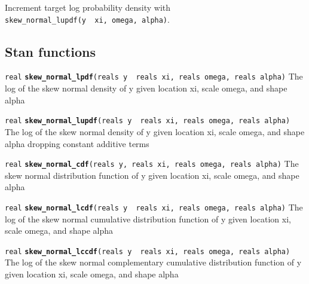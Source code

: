 \documentclass[
  10pt,
]{book}
\begin{document}
Increment target log probability density with \texttt{skew\_normal\_lupdf(y\ \textbar{}\ xi,\ omega,\ alpha)}.

\hypertarget{stan-functions-25}{%
\subsection{Stan functions}\label{stan-functions-25}}


\texttt{real} \textbf{\texttt{skew\_normal\_lpdf}}\texttt{(reals\ y\ \textbar{}\ reals\ xi,\ reals\ omega,\ reals\ alpha)}\newline
The log of the skew normal density of y given location xi, scale
omega, and shape alpha


\texttt{real} \textbf{\texttt{skew\_normal\_lupdf}}\texttt{(reals\ y\ \textbar{}\ reals\ xi,\ reals\ omega,\ reals\ alpha)}\newline
The log of the skew normal density of y given location xi, scale
omega, and shape alpha dropping constant additive terms


\texttt{real} \textbf{\texttt{skew\_normal\_cdf}}\texttt{(reals\ y,\ reals\ xi,\ reals\ omega,\ reals\ alpha)}\newline
The skew normal distribution function of y given location xi, scale
omega, and shape alpha


\texttt{real} \textbf{\texttt{skew\_normal\_lcdf}}\texttt{(reals\ y\ \textbar{}\ reals\ xi,\ reals\ omega,\ reals\ alpha)}\newline
The log of the skew normal cumulative distribution function of y given
location xi, scale omega, and shape alpha


\texttt{real} \textbf{\texttt{skew\_normal\_lccdf}}\texttt{(reals\ y\ \textbar{}\ reals\ xi,\ reals\ omega,\ reals\ alpha)}\newline
The log of the skew normal complementary cumulative distribution
function of y given location xi, scale omega, and shape alpha
\end{document}
